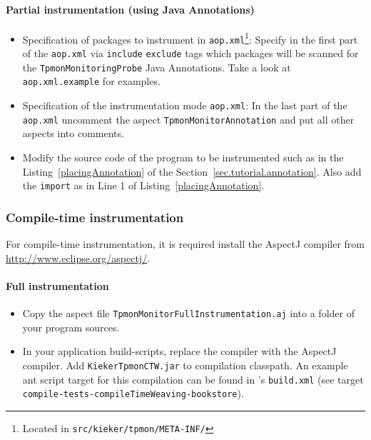 \documentclass[a4paper,12pt]{scrartcl}
\begin{document}
\paragraph{Partial instrumentation (using Java Annotations)}
\begin{itemize}
 \item Specification of packages to instrument in \texttt{aop.xml}\footnote{Located in \texttt{src/kieker/tpmon/META-INF/}}: Specify in the first part of the \texttt{aop.xml} via \texttt{include} \texttt{exclude} tags which packages will be scanned for the \texttt{TpmonMonitoringProbe} Java Annotations. Take a look at  \texttt{aop.xml.example} for examples.
\item Specification of the instrumentation mode \texttt{aop.xml}: In the last part of the \texttt{aop.xml} uncomment the aspect \texttt{TpmonMonitorAnnotation} and put all other aspects into comments.
\item Modify the source code of the program to be instrumented such as in the Listing~\ref{placingAnnotation} of the Section~\ref{sec.tutorial.annotation}. Also add the \texttt{import} as in Line 1 of Listing~\ref{placingAnnotation}.
\end{itemize}

\subsubsection{Compile-time instrumentation}
For compile-time instrumentation, it is required install the AspectJ compiler from \url{http://www.eclipse.org/aspectj/}.

\paragraph{Full instrumentation}
\begin{itemize}
 \item Copy the aspect file \texttt{\small TpmonMonitorFullInstrumentation.aj} into a folder of your program sources.
\item In your application build-scripts, replace the compiler with the AspectJ compiler. Add \texttt{KiekerTpmonCTW.jar} to compilation classpath. An example ant script target for this compilation can be found in \tpmon{}'s \texttt{build.xml} (see target \\ \texttt{compile-tests-compileTimeWeaving-bookstore}).
\end{itemize}
\end{document}
